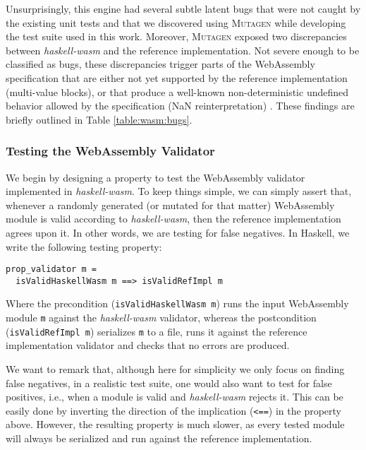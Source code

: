 \documentclass[acmsmall, anonymous]{acmart}
\newcommand{\mutagen}{\textsc{Mutagen}\xspace}
\begin{document}
Unsurprisingly, this engine had several subtle latent bugs that were not caught
by the existing unit tests and that we discovered using \mutagen while
developing the test suite used in this work.
%
Moreover, \mutagen exposed two discrepancies between \textit{haskell-wasm} and
the reference implementation.
%
Not severe enough to be classified as bugs, these discrepancies trigger parts of
the WebAssembly specification that are either not yet supported by the reference
implementation (multi-value blocks), or that produce a well-known
non-deterministic undefined behavior allowed by the specification (NaN
reinterpretation) \cite{perenyi2020stack}.
%
These findings are briefly outlined in Table \ref{table:wasm:bugs}.


\subsubsection{Testing the WebAssembly Validator}

We begin by designing a property to test the WebAssembly validator implemented
in \textit{haskell-wasm}.
%
To keep things simple, we can simply assert that, whenever a randomly generated
(or mutated for that matter) WebAssembly module is valid according to
\textit{haskell-wasm}, then the reference implementation agrees upon it.
%
In other words, we are testing for false negatives.
%
In Haskell, we write the following testing property:

\begin{verbatim}
prop_validator m =
  isValidHaskellWasm m ==> isValidRefImpl m
\end{verbatim}

Where the precondition (\texttt{isValidHaskellWasm m}) runs the input WebAssembly
module \texttt{m} against the \textit{haskell-wasm} validator, whereas the
postcondition (\texttt{isValidRefImpl m}) serializes \texttt{m} to a file, runs it
against the reference implementation validator and checks that no errors are
produced.

We want to remark that, although here for simplicity we only focus on finding
false negatives, in a realistic test suite, one would also want to test for
false positives, i.e., when a module is valid and \textit{haskell-wasm} rejects
it.
%
This can be easily done by inverting the direction of the implication
(\texttt{<==}) in the property above.
%
However, the resulting property is much slower, as every tested module will
always be serialized and run against the reference implementation.
\end{document}
